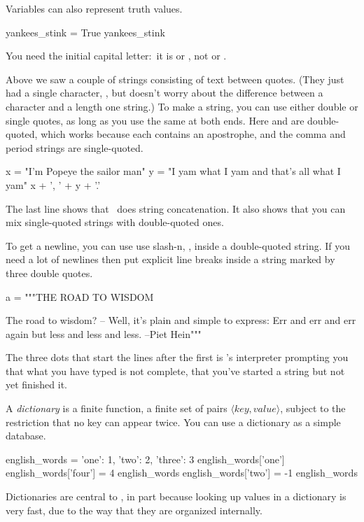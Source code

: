 Variables can also represent truth values.
\begin{pythonconsole}
yankees_stink = True
yankees_stink
\end{pythonconsole}
You need the initial capital letter:~it is
or , not
or .
 
Above we saw a couple of strings consisting of text between quotes.
(They just had a single character, ,
but \python{} doesn't worry about the difference between a character
and a length one string.)
To make a string, you can use either double or single quotes, as long as you use
the same at both ends. 
Here  and 
are double-quoted, which works because each contains
an apostrophe, and the comma and period strings are single-quoted. 
\begin{pythonconsole}
x = "I'm Popeye the sailor man"
y = "I yam what I yam and that's all what I yam"
x + ', ' + y + '.'
\end{pythonconsole}
The last line shows that~\inlinecode{+} 
does string concatenation.
It also shows that you can mix single-quoted strings
with double-quoted ones.

To get a newline, you can use use slash-n, \inlinecode{\\n}, 
inside a double-quoted string.
If you need a lot of newlines then
put explicit line breaks inside a string marked by three double quotes.
\begin{pythonconsole}
a = """THE ROAD TO WISDOM
 
The road to wisdom?
-- Well, it's plain
and simple to express:
Err
and err
and err again
but less
and less
and less. --Piet Hein"""
\end{pythonconsole} 
The three dots that start the lines after the first
is \python's
interpreter prompting you that what you have typed is not complete,
that you've started a string but not yet finished it.

A \python{} \textit{dictionary} is a finite function,
a finite
set of pairs $\langle\textit{key},\textit{value}\rangle$,
subject to the restriction that no key can appear twice.
You can use a dictionary as a simple database.
\begin{pythonconsole}
english_words = {'one': 1, 'two': 2, 'three': 3}
english_words['one']
english_words['four'] = 4  
english_words
english_words['two'] = -1
english_words
\end{pythonconsole} 
Dictionaries are central to \python, in part because looking up values 
in a dictionary is very fast, due to the way that they are 
organized internally.

